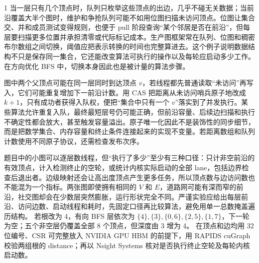 \begin{solutionexercise}{1}
当一层只有几个顶点时，队列只枚举这些顶点的出边，几乎不碰无关数据；当前沿覆盖大半个图时，维护和争抢队列可能不如用位图扫描未访问顶点。位图让集合交、并和成员测试变得规则，也便于 pull 阶段查询“某个邻居是否在前沿”，但每层要扫描更多位置并承担清零或代际标记成本。生产图框架常在队列、位图和稠密布尔数组之间切换，阈值应把表示转换的时间也完整算进去。这个例子说明数据结构不只是保存同一集合，它还能改变算法可执行的操作以及每轮应启动多少工作。在方向优化 BFS 中，切换本身因此也是被计量的算法步骤。

图中两个父顶点可能在同一层同时到达顶点 $v$，若线程都先普通读取“未访问”再写入，它们可能重复增加下一前沿计数。用 CAS 把距离从未访问哨兵原子地改成 $k+1$，只有成功者获得入队权，便把“集合中只有一个 $v$”落实到了并发执行。某些算法允许重复入队，最终最短层号仍可能正确，但前沿容量、后续边扫描和执行不确定性都会放大，甚至触发容量溢出。原子唯一化因此不是装饰性的同步细节，而是把数学集合、内存容量和终止条件连接起来的实现不变量。若距离数组和队列计数使用不同原子协议，还需检查发布次序。

题目中的小图可以逐层数线程，但“执行了多少”至少有三种口径：只计非空前沿的有效顶点，计入检测终止的空轮，或统计内核实际启动的全部 lane，包括边界检查后退出者。边级映射还会让高出度顶点产生更多任务，所以顶点数与边访问数也不能混为一个指标。两张图即使拥有相同的 $V$ 和 $E$，道路网可能有深而窄的前沿，社交图却会在少数层突然膨胀，运行形状完全不同。严谨实验应给出每层前沿、访问边数、启动线程和耗时，先固定口径再比较算法，避免用单一总数掩盖遍历结构。
\variantheading 若根改为 4，有向 BFS 层依次为 $\{4\},\{3\},\{0,6\},\{2,5\},\{1,7\}$，下一轮为空；五个非空层仍覆盖全部 8 个顶点，但深度由 3 增为 4。
\practiceheading 在顶点和边均用 32 位编号、CSR 可完整放入 NVIDIA GPU HBM 的前提下，用 RAPIDS cuGraph  校验两组根的 distance；再以 Nsight Systems 核对是否执行终止空轮及每轮内核启动数。
\end{solutionexercise}

